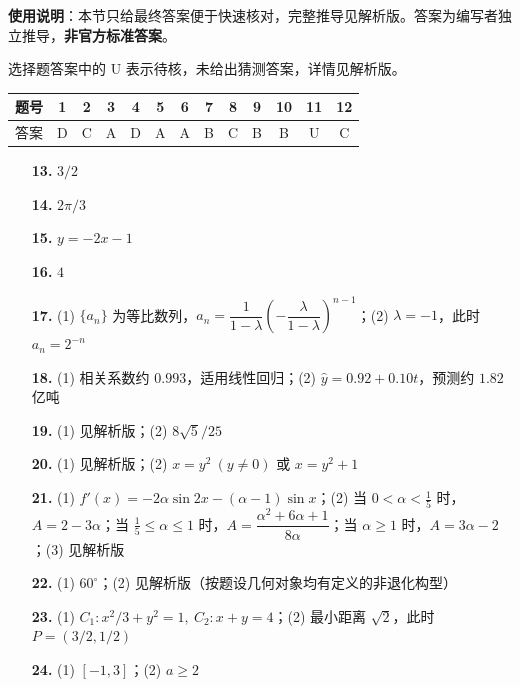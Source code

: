 
\begin{gknotice}
\textbf{使用说明}：本节只给最终答案便于快速核对，完整推导见解析版。答案为编写者独立推导，\textbf{非官方标准答案}。
\end{gknotice}

\begin{gknotice}
选择题答案中的 U 表示待核，未给出猜测答案，详情见解析版。
\end{gknotice}

\begin{center}\begin{tabular}{ccccccccccccc}
\toprule
题号 & 1 & 2 & 3 & 4 & 5 & 6 & 7 & 8 & 9 & 10 & 11 & 12 \\
\midrule
答案 & D & C & A & D & A & A & B & C & B & B & U & C \\
\bottomrule
\end{tabular}\end{center}

\begin{itemize}[leftmargin=2.6em]
  \item[\textbf{13.}] \(3/2\)
  \item[\textbf{14.}] \(2\pi/3\)
  \item[\textbf{15.}] \(y=-2x-1\)
  \item[\textbf{16.}] \(4\)
\end{itemize}

\begin{itemize}[leftmargin=2.6em]
  \item[\textbf{17.}] (1) \(\{a_n\}\) 为等比数列，\(a_n=\dfrac1{1-\lambda}\left(-\dfrac{\lambda}{1-\lambda}\right)^{n-1}\)；(2) \(\lambda=-1\)，此时 \(a_n=2^{-n}\)
  \item[\textbf{18.}] (1) 相关系数约 \(0.993\)，适用线性回归；(2) \(\hat y=0.92+0.10t\)，预测约 \(1.82\) 亿吨
  \item[\textbf{19.}] (1) 见解析版；(2) \(8\sqrt5/25\)
  \item[\textbf{20.}] (1) 见解析版；(2) \(x=y^2\ (y\ne0)\) 或 \(x=y^2+1\)
  \item[\textbf{21.}] (1) \(f'(x)=-2\alpha\sin2x-(\alpha-1)\sin x\)；(2) 当 \(0<\alpha<\frac15\) 时，\(A=2-3\alpha\)；当 \(\frac15\leq\alpha\leq1\) 时，\(A=\dfrac{\alpha^2+6\alpha+1}{8\alpha}\)；当 \(\alpha\geq1\) 时，\(A=3\alpha-2\)；(3) 见解析版
\end{itemize}

\begin{itemize}[leftmargin=2.6em]
  \item[\textbf{22.}] (1) \(60^\circ\)；(2) 见解析版（按题设几何对象均有定义的非退化构型）
  \item[\textbf{23.}] (1) \(C_1:x^2/3+y^2=1,\ C_2:x+y=4\)；(2) 最小距离 \(\sqrt2\)，此时 \(P=(3/2,1/2)\)
  \item[\textbf{24.}] (1) \([-1,3]\)；(2) \(a\ge2\)
\end{itemize}
